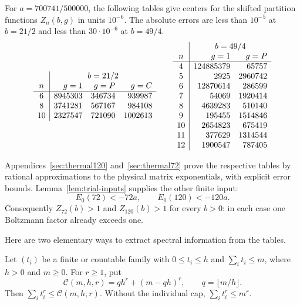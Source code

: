 \begin{lemma}\label{lem:thermal-inputs}
For $a=700741/500000$, the following tables give centers for the shifted
partition functions $Z_n(b,g)$ in units $10^{-6}$.
The absolute errors are less than $10^{-5}$ at $b=21/2$ and less than
$30\cdot10^{-6}$ at $b=49/4$.
\[
\begin{array}{c|rrr}
 &\multicolumn{3}{c}{b=21/2}\\
 n&g=1&g=P&g=C\\ \hline
 6&8945303&346734&939987\\
 8&3741281&567167&984108\\
 10&2327547&721090&1002613
\end{array}
\qquad
\begin{array}{c|rr}
 &\multicolumn{2}{c}{b=49/4}\\
 n&g=1&g=P\\ \hline
 4&124885379&65757\\
 5&2925&2960742\\
 6&12870614&286599\\
 7&54069&1920414\\
 8&4639283&510140\\
 9&195455&1514846\\
 10&2654823&675419\\
 11&377629&1314544\\
 12&1900547&787405
\end{array}
\]
\end{lemma}

Appendices~\ref{sec:thermal120} and~\ref{sec:thermal72} prove the respective
tables by rational approximations to the physical matrix exponentials,
with explicit error bounds.  Lemma~\ref{lem:trial-inputs} supplies the other
finite input:
\begin{equation}\label{eq:trial-thermal-consequence}
 E_0(72)<-72a,\qquad E_0(120)<-120a.
\end{equation}
Consequently $Z_{72}(b)>1$ and $Z_{120}(b)>1$ for every $b>0$: in each case
one Boltzmann factor already exceeds one.

Here are two elementary ways to extract spectral information from the tables.

\begin{lemma}\label{lem:cappedmass}
Let $(t_i)$ be a finite or countable family with $0\le t_i\le h$ and
$\sum_i t_i\le m$, where $h>0$ and $m\ge0$.  For $r\ge1$, put
\begin{equation}\label{eq:capped-function}
 \mathcal C(m,h,r)=q h^r+(m-qh)^r,\qquad q=\lfloor m/h\rfloor.
\end{equation}
Then $\sum_i t_i^r\le\mathcal C(m,h,r)$.  Without the individual cap,
$\sum_i t_i^r\le m^r$.
\end{lemma}

